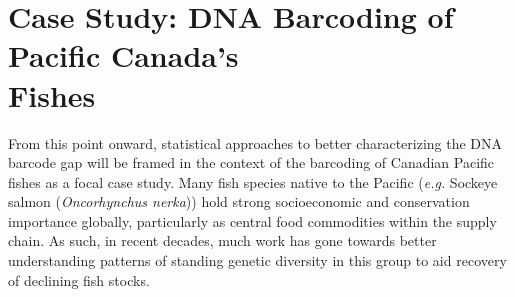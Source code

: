 \section{Case Study: DNA Barcoding of Pacific Canada's \\ Fishes}

From this point onward, statistical approaches to better characterizing the DNA barcode gap will be framed in the context of the barcoding of Canadian Pacific fishes as a focal case study. Many fish species native to the Pacific (\textit{e.g.} Sockeye salmon (\textit{Oncorhynchus nerka})) hold strong socioeconomic and conservation importance globally, particularly as central food commodities within the supply chain. As such, in recent decades, much work has gone towards better understanding patterns of standing genetic diversity in this group to aid recovery of declining fish stocks.   



